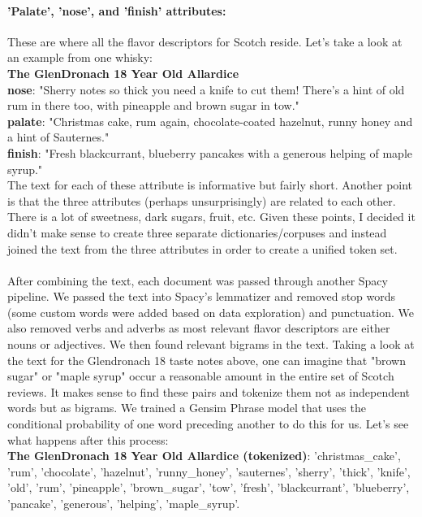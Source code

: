 \documentclass{article}
\begin{document}
 	 \paragraph{'Palate', 'nose', and 'finish' attributes:} 
 	 
 	 These are where all the flavor descriptors for Scotch reside. Let's take a look at an example from one whisky:
 	\\
 	\textbf{The GlenDronach 18 Year Old Allardice}
 	 \\
 	  \textbf{nose}: "Sherry notes so thick you need a knife to cut them! There's a hint of old rum in there too, with pineapple and brown sugar in tow." \\
 	  \textbf{palate}: "Christmas cake, rum again, chocolate-coated hazelnut, runny honey and a hint of Sauternes." \\ 
 	  \textbf{finish}: "Fresh blackcurrant, blueberry pancakes with a generous helping of maple syrup."
 	  \\
 	 
 	 The text for each of these attribute is informative but fairly short. Another point is that the three attributes (perhaps unsurprisingly) are related to each other. There is a lot of sweetness, dark sugars, fruit, etc. Given these points, I decided it didn't make sense to create three separate dictionaries/corpuses and instead joined the text from the three attributes in order to create a unified token set.
 	 \paragraph{} After combining the text, each document was passed through another Spacy pipeline. We passed the text into Spacy's lemmatizer and removed stop words (some custom words were added based on data exploration) and punctuation. We also removed verbs and adverbs as most relevant flavor descriptors are either nouns or adjectives. We then found relevant bigrams in the text. Taking a look at the text for the Glendronach 18 taste notes above, one can imagine that "brown sugar" or "maple syrup" occur a reasonable amount in the entire set of Scotch reviews. It makes sense to find these pairs and tokenize them not as independent words but as bigrams. We trained a Gensim Phrase model that uses the conditional probability of one word preceding another to do this for us. Let's see what happens after this process: \\
 	 \textbf{The GlenDronach 18 Year Old Allardice (tokenized)}: 'christmas\_cake', 'rum', 'chocolate', 'hazelnut', 'runny\_honey', 'sauternes', 'sherry', 'thick', 'knife', 'old', 'rum', 'pineapple', 'brown\_sugar', 'tow', 'fresh', 'blackcurrant', 'blueberry', 'pancake', 'generous', 'helping', 'maple\_syrup'.
\end{document}

